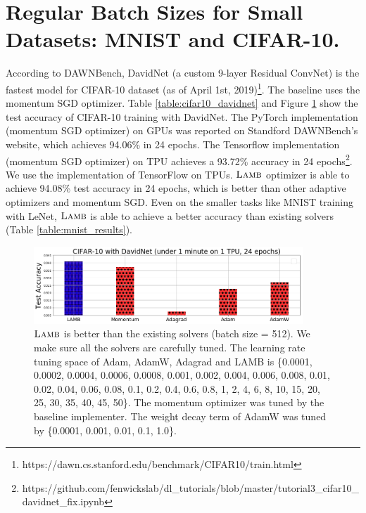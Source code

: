 \section{Regular Batch Sizes for Small Datasets: MNIST and CIFAR-10.}
According to DAWNBench, DavidNet (a custom 9-layer Residual ConvNet) is the fastest model for CIFAR-10 dataset (as of April 1st, 2019)\footnote{https://dawn.cs.stanford.edu/benchmark/CIFAR10/train.html}.
The baseline uses the momentum SGD optimizer.
Table \ref{table:cifar10_davidnet} and Figure \ref{fig:cifar10_davidnet} show the test accuracy of CIFAR-10 training with DavidNet. The PyTorch implementation (momentum SGD optimizer) on GPUs was reported on Standford DAWNBench's website, which achieves 94.06\% in 24 epochs. The Tensorflow implementation (momentum SGD optimizer) on TPU achieves a 93.72\% accuracy in 24 epochs\footnote{https://github.com/fenwickslab/dl\_tutorials/blob/master/tutorial3\_cifar10\_davidnet\_fix.ipynb}. We use the implementation of TensorFlow on TPUs. $\textsc{Lamb}$ optimizer is able to achieve 94.08\% test accuracy in 24 epochs, which is better than other adaptive optimizers and momentum SGD.
Even on the smaller tasks like MNIST training with LeNet, $\textsc{Lamb}$ is able to achieve a better accuracy than existing solvers (Table \ref{table:mnist_results}).


\begin{figure}[tb]
\vspace{5pt}
\centering
\includegraphics[width=0.9\textwidth]{figs/cifar10_davidnet.png}
\caption{$\textsc{Lamb}$ is better than the existing solvers (batch size = 512). We make sure all the solvers are carefully tuned. The learning rate tuning space of Adam, AdamW, Adagrad and LAMB is \{0.0001, 0.0002, 0.0004, 0.0006, 0.0008, 0.001, 0.002, 0.004, 0.006, 0.008, 0.01, 0.02, 0.04, 0.06, 0.08, 0.1, 0.2, 0.4, 0.6, 0.8, 1, 2, 4, 6, 8, 10, 15, 20, 25, 30, 35, 40, 45, 50\}. The momentum optimizer was tuned by the baseline implementer. The weight decay term of AdamW was tuned by \{0.0001, 0.001, 0.01, 0.1, 1.0\}.}
\label{fig:cifar10_davidnet}
\vspace{-10pt}
\end{figure}


